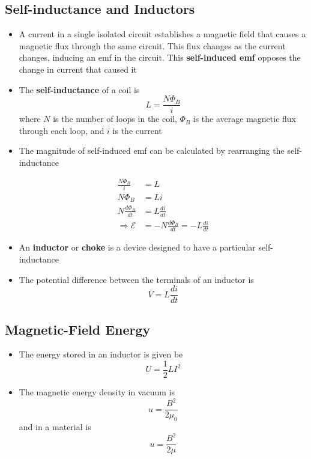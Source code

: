\documentclass{article}
\begin{document}
\subsection{Self-inductance and Inductors}

\begin{itemize}
  \item A current in a single isolated circuit establishes a magnetic field that causes a magnetic flux through the same circuit. This flux changes as the current changes, inducing an emf in the circuit. This \textbf{self-induced emf} opposes the change in current that caused it

  \item The \textbf{self-inductance} of a coil is \[L = \frac{N \Phi_B}{i}\] where $N$ is the number of loops in the coil, $\Phi_B$ is the average magnetic flux through each loop, and $i$ is the current

  \item The magnitude of self-induced emf can be calculated by rearranging the self-inductance

        \begin{align*}
          \frac{N \Phi_B}{i}      & = L                                         \\
          N \Phi_B                & = L i                                       \\
          N \frac{d \Phi_B}{dt}   & = L \frac{di}{dt}                           \\
          \Rightarrow \mathcal{E} & = -N \frac{d \Phi_B}{dt} = -L \frac{di}{dt}
        \end{align*}

  \item An \textbf{inductor} or \textbf{choke} is a device designed to have a particular self-inductance

  \item The potential difference between the terminals of an inductor is \[V = L \frac{di}{dt}\]
\end{itemize}

\subsection{Magnetic-Field Energy}

\begin{itemize}
  \item The energy stored in an inductor is given be \[U = \frac{1}{2} L I^2\]

  \item The magnetic energy density in vacuum is \[u = \frac{B^2}{2 \mu_0}\] and in a material is \[u = \frac{B^2}{2 \mu}\]
\end{itemize}
\end{document}
